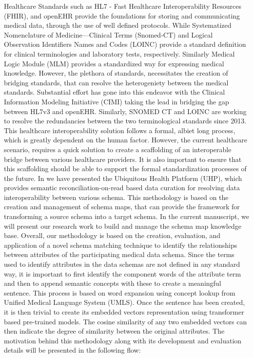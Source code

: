 \documentclass{ieeeaccess}
\begin{document}
Healthcare Standards such as HL7 - Fast Healthcare Interoperability Resources (FHIR), and openEHR provide the foundations for storing and communicating medical data, through the use of well defined protocols. While Systematized Nomenclature of Medicine—Clinical Terms (Snomed-CT) \cite{snomedct_url} and Logical Observation Identifiers Names and Codes (LOINC) \cite{loinc} provide a standard definition for clinical terminologies and laboratory tests, respectively. Similarly Medical Logic Module (MLM) provides a standardized way for expressing medical knowledge. However, the plethora of standards, necessitates the creation of bridging standards, that can resolve the heterogeniety between the medical standards. Substantial effort has gone into this endeavor with the Clinical Information Modeling Initiative (CIMI) \cite{CIMI2015} taking the lead in bridging the gap between HL7v3 and openEHR. Similarly, SNOMED CT and LOINC are working to resolve the redundancies between the two terminological standards since 2013. This healthcare interoperability solution follows a formal, albiet long process, which is greatly dependent on the human factor. However, the current healthcare scenario, requires a quick solution to create a scaffolding of an interoperable bridge between various healthcare providers. It is also important to ensure that this scaffolding should be able to support the formal standardization processes of the future. In \cite{Satti2020}we have presented the Ubiquitous Health Platform (UHP), which provides semantic reconciliation-on-read based data curation for resolving data interoperability between various schema. This methodology is based on the creation and management of schema maps, that can provide the framework for transforming a source schema into a target schema. 
In the current manuscript, we will present our research work to build and manage the schema map knowledge base. Overall, our methodology is based on the creation, evaluation, and application of a novel schema matching technique to identify the relationships between attributes of the participating medical data schema. Since the terms used to identify attributes in the data schemas are not defined in any standard way, it is important to first identify the component words of the attribute term and then to append semantic concepts with these to create a meaningful sentence. This process is based on word expansion using concept lookup from Unified Medical Language System (UMLS). Once the sentence has been created, it is then trivial to create its embedded vectors representation using transformer based pre-trained models. The cosine similarity of any two embedded vectors can then indicate the degree of similarity between the original attributes. The motivation behind this methodology along with its development and evaluation details will be presented in the following flow:
\end{document}
